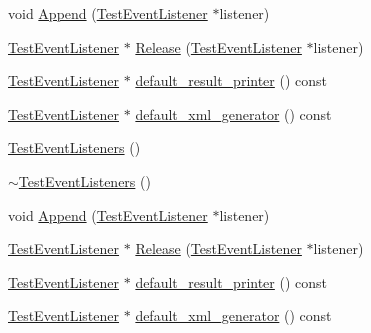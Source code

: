 \begin{DoxyCompactItemize}
void \mbox{\hyperlink{classtesting_1_1_test_event_listeners_a1207dce74d64c1c39ffa6105560536a0}{Append}} (\mbox{\hyperlink{classtesting_1_1_test_event_listener}{Test\+Event\+Listener}} $\ast$listener)
\item 
\mbox{\hyperlink{classtesting_1_1_test_event_listener}{Test\+Event\+Listener}} $\ast$ \mbox{\hyperlink{classtesting_1_1_test_event_listeners_a5d4bfb7d8584801d6074bb0ec28f8bda}{Release}} (\mbox{\hyperlink{classtesting_1_1_test_event_listener}{Test\+Event\+Listener}} $\ast$listener)
\item 
\mbox{\hyperlink{classtesting_1_1_test_event_listener}{Test\+Event\+Listener}} $\ast$ \mbox{\hyperlink{classtesting_1_1_test_event_listeners_a6293443acb5af942eeec638b6aa6dcf2}{default\+\_\+result\+\_\+printer}} () const
\item 
\mbox{\hyperlink{classtesting_1_1_test_event_listener}{Test\+Event\+Listener}} $\ast$ \mbox{\hyperlink{classtesting_1_1_test_event_listeners_aa880de6ddfc3f5824371853c6846abbd}{default\+\_\+xml\+\_\+generator}} () const
\item 
\mbox{\hyperlink{classtesting_1_1_test_event_listeners_af0716e4067a6f357ee5ea18802a591dd}{Test\+Event\+Listeners}} ()
\item 
\mbox{\hyperlink{classtesting_1_1_test_event_listeners_abe9fbbbedf7f55fa898abfae60aa4913}{$\sim$\+Test\+Event\+Listeners}} ()
\item 
void \mbox{\hyperlink{classtesting_1_1_test_event_listeners_a1207dce74d64c1c39ffa6105560536a0}{Append}} (\mbox{\hyperlink{classtesting_1_1_test_event_listener}{Test\+Event\+Listener}} $\ast$listener)
\item 
\mbox{\hyperlink{classtesting_1_1_test_event_listener}{Test\+Event\+Listener}} $\ast$ \mbox{\hyperlink{classtesting_1_1_test_event_listeners_a5d4bfb7d8584801d6074bb0ec28f8bda}{Release}} (\mbox{\hyperlink{classtesting_1_1_test_event_listener}{Test\+Event\+Listener}} $\ast$listener)
\item 
\mbox{\hyperlink{classtesting_1_1_test_event_listener}{Test\+Event\+Listener}} $\ast$ \mbox{\hyperlink{classtesting_1_1_test_event_listeners_a6293443acb5af942eeec638b6aa6dcf2}{default\+\_\+result\+\_\+printer}} () const
\item 
\mbox{\hyperlink{classtesting_1_1_test_event_listener}{Test\+Event\+Listener}} $\ast$ \mbox{\hyperlink{classtesting_1_1_test_event_listeners_aa880de6ddfc3f5824371853c6846abbd}{default\+\_\+xml\+\_\+generator}} () const
\end{DoxyCompactItemize}
